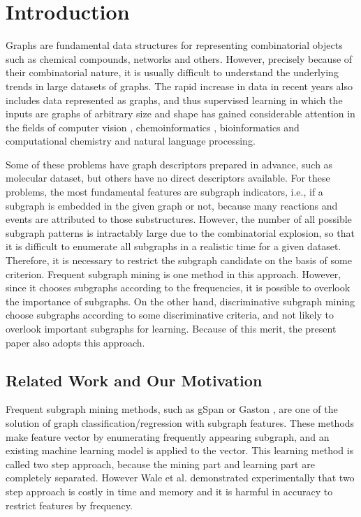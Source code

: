 \section{Introduction}
Graphs are fundamental data structures for representing combinatorial objects 
such as chemical compounds, networks and others.
However, precisely because of their combinatorial nature, 
it is usually difficult to understand the underlying trends in large datasets of graphs.
The rapid increase in data in recent years also includes data
represented as graphs, and thus supervised learning in which the inputs are graphs of
arbitrary size and shape has gained considerable attention
in the fields of computer vision \cite{Harchaoui:2007, Nowozin:2007, Barra:2013, Bai:2014a},
chemoinformatics \cite{Kashima:2003, Tsuda:2007,Saigo:2008a, Saigo:2009,Mahe:2009, 
Vishwanathan:2010, Shrvashidze:2011, Takigawa:2013, takigawa:2017},
bioinformatics\cite{Borgwardt:2005, Karklin:2005, Takigawa:2011b} 
and computational chemistry\cite{Kearnes2016, gilmer:2017} 
and natural language processing\cite{Kudo:2005}. 

Some of these problems have graph descriptors prepared in advance, 
such as molecular dataset\cite{james:2004, durant:2002}, 
but others have no direct descriptors available.
For these problems, the most fundamental features are subgraph indicators, 
i.e., if a subgraph is embedded in the given graph or not,
because many reactions and events are attributed to those substructures.
However, the number of all possible subgraph patterns is intractably large 
due to the combinatorial explosion, 
so that it is difficult to enumerate all subgraphs in a realistic time for a given dataset.
Therefore, it is necessary to restrict the subgraph candidate on the basis of some criterion.
Frequent subgraph mining \cite{Yan:2002, Nijssen:2004} is one method in this approach.
However, since it chooses subgraphs according to the frequencies, 
it is possible to overlook the importance of subgraphs.
On the other hand, discriminative subgraph mining 
\cite{Yan:2008, Fan:2008, Saigo:2009, Shirakawa:2018} 
choose subgraphs according to some discriminative criteria, 
and not likely to overlook important subgraphs for learning.
Because of this merit, the present paper also adopts this approach.

\subsection{Related Work and Our Motivation}
\label{sec:relatedwork}
Frequent subgraph mining methods, such as gSpan \cite{Yan:2002} or Gaston \cite{Nijssen:2004}, 
are one of the solution of graph classification/regression with subgraph features.
These methods make feature vector by enumerating frequently appearing subgraph, 
and an existing machine learning model is applied to the vector.
This learning method is called two step approach, 
because the mining part and learning part are completely separated.
However Wale et al. \cite{Wale:2008} demonstrated experimentally that 
two step approach is costly in time and memory 
and it is harmful in accuracy to restrict features by frequency.

